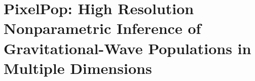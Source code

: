 %
%
%
%
%
%
%
\chapter{PixelPop: High Resolution Nonparametric Inference of Gravitational-Wave Populations in Multiple Dimensions}

